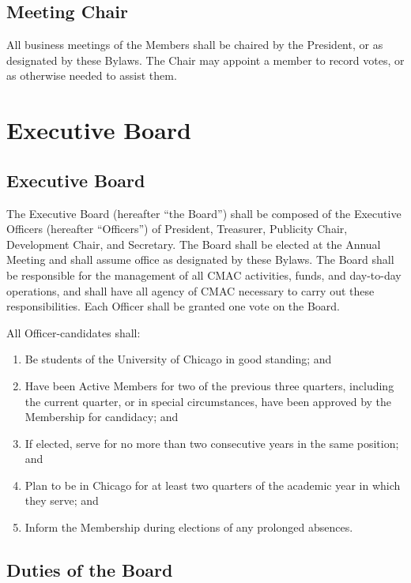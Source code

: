 \documentclass{article}
\begin{document}
\subsection{Meeting Chair}

All business meetings of the Members shall be chaired by the President,
or as designated by these Bylaws. The Chair may appoint a member to
record votes, or as otherwise needed to assist them.

\section{Executive Board} \label{board}
\subsection{Executive Board}

The Executive Board (hereafter ``the Board'') shall be composed of the Executive
Officers (hereafter ``Officers'') of President, Treasurer, Publicity Chair,
Development Chair, and Secretary. The Board shall be elected at the Annual
Meeting and shall assume office as designated by these Bylaws. The Board shall
be responsible for the management of all CMAC activities, funds, and day-to-day
operations, and shall have all agency of CMAC necessary to carry out these
responsibilities. Each Officer shall be granted one vote on the Board.

All Officer-candidates shall:
\begin{enumerate}
\item Be students of the University of Chicago in good standing;
and
\item Have been Active Members for two of the previous three quarters, including
the current quarter, or in special circumstances, have been approved
by the Membership for candidacy; and
\item If elected, serve for no more than two consecutive years in the same
position; and
\item Plan to be in Chicago for at least two quarters of the academic year
in which they serve; and
\item Inform the Membership during elections of any prolonged absences.
\end{enumerate}

\subsection{Duties of the Board}
\end{document}
